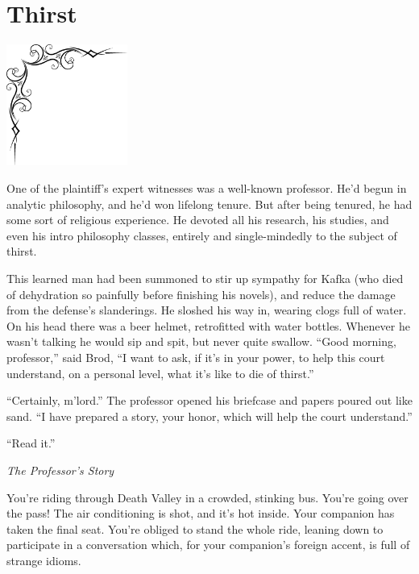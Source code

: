 \documentclass[oneside]{book}
\begin{document}
\chapter{Thirst}

\vspace{-2in}
\hspace{-.5in}
\includegraphics[width=150px]{ulcorner1.eps}

One of the plaintiff's expert witnesses was a well-known professor.
He'd begun in analytic philosophy, and he'd won lifelong tenure.  But
after being tenured, he had some sort of religious experience.  He devoted
all his research, his studies, and even his intro philosophy classes, 
entirely and single-mindedly to the subject of thirst.

This learned man had been summoned to stir
up sympathy for Kafka (who died of dehydration so painfully before finishing his novels),
and reduce the damage from the defense's slanderings.
He sloshed his way in, wearing clogs full of water.
On his head there was a beer helmet, retrofitted with water bottles.
Whenever he wasn't talking he would sip and spit, but never quite swallow.
``Good morning, professor,'' said Brod, ``I want to ask, if it's in your power, to
help this court understand, on a personal level, what it's like to die of thirst.''

``Certainly, m'lord.''  The professor opened his briefcase and papers poured out like sand.  ``I have prepared a story, your honor, which will help
the court understand.''

``Read it.''

\vspace{2mm}
\noindent \textit{The Professor's Story}
\vspace{2mm}

You're riding through Death Valley in a crowded, stinking bus.
You're going over the pass!
The air conditioning is shot, and it's hot inside.
Your companion has taken the final seat.
You're obliged to stand the whole ride, leaning down to participate in a conversation
which, for your companion's foreign accent, is full of strange idioms.
\end{document}
